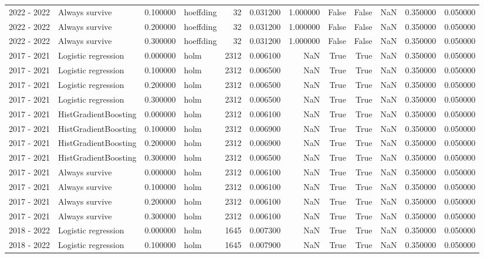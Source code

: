 \begin{tabular}{llrlrrrrrrrr}
2022 - 2022 & Always survive & 0.100000 & hoeffding & 32 & 0.031200 & 1.000000 & False & False & NaN & 0.350000 & 0.050000 \\
2022 - 2022 & Always survive & 0.200000 & hoeffding & 32 & 0.031200 & 1.000000 & False & False & NaN & 0.350000 & 0.050000 \\
2022 - 2022 & Always survive & 0.300000 & hoeffding & 32 & 0.031200 & 1.000000 & False & False & NaN & 0.350000 & 0.050000 \\
2017 - 2021 & Logistic regression & 0.000000 & holm & 2312 & 0.006100 & NaN & True & True & NaN & 0.350000 & 0.050000 \\
2017 - 2021 & Logistic regression & 0.100000 & holm & 2312 & 0.006500 & NaN & True & True & NaN & 0.350000 & 0.050000 \\
2017 - 2021 & Logistic regression & 0.200000 & holm & 2312 & 0.006500 & NaN & True & True & NaN & 0.350000 & 0.050000 \\
2017 - 2021 & Logistic regression & 0.300000 & holm & 2312 & 0.006500 & NaN & True & True & NaN & 0.350000 & 0.050000 \\
2017 - 2021 & HistGradientBoosting & 0.000000 & holm & 2312 & 0.006100 & NaN & True & True & NaN & 0.350000 & 0.050000 \\
2017 - 2021 & HistGradientBoosting & 0.100000 & holm & 2312 & 0.006900 & NaN & True & True & NaN & 0.350000 & 0.050000 \\
2017 - 2021 & HistGradientBoosting & 0.200000 & holm & 2312 & 0.006900 & NaN & True & True & NaN & 0.350000 & 0.050000 \\
2017 - 2021 & HistGradientBoosting & 0.300000 & holm & 2312 & 0.006500 & NaN & True & True & NaN & 0.350000 & 0.050000 \\
2017 - 2021 & Always survive & 0.000000 & holm & 2312 & 0.006100 & NaN & True & True & NaN & 0.350000 & 0.050000 \\
2017 - 2021 & Always survive & 0.100000 & holm & 2312 & 0.006100 & NaN & True & True & NaN & 0.350000 & 0.050000 \\
2017 - 2021 & Always survive & 0.200000 & holm & 2312 & 0.006100 & NaN & True & True & NaN & 0.350000 & 0.050000 \\
2017 - 2021 & Always survive & 0.300000 & holm & 2312 & 0.006100 & NaN & True & True & NaN & 0.350000 & 0.050000 \\
2018 - 2022 & Logistic regression & 0.000000 & holm & 1645 & 0.007300 & NaN & True & True & NaN & 0.350000 & 0.050000 \\
2018 - 2022 & Logistic regression & 0.100000 & holm & 1645 & 0.007900 & NaN & True & True & NaN & 0.350000 & 0.050000 \\

\end{tabular}
